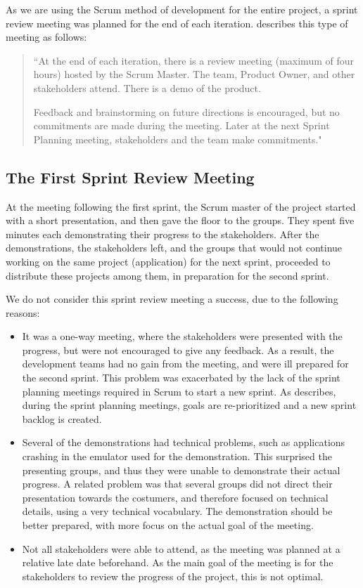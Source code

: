 As we are using the Scrum method of development for the entire \giraf project, a sprint review meeting was planned for the end of each iteration. 
\citet[p. 71]{larmanAgile} describes this type of meeting as follows:
\begin{quote}
``At the end of each iteration, there is a review meeting (maximum of four hours)
hosted by the Scrum Master.
The team, Product Owner, and other stakeholders attend.
There is a demo of the product.

Feedback and brainstorming on future directions is encouraged, but no commitments are made during the meeting.
Later at the next Sprint Planning meeting, stakeholders and the team make commitments."
\end{quote}

\subsection{The First Sprint Review Meeting}
At the meeting following the first sprint, the Scrum master of the \giraf project started with a short presentation, and then gave the floor to the groups.
They spent five minutes each demonstrating their progress to the stakeholders. 
After the demonstrations, the stakeholders left, and the groups that would not continue working on the same project (\giraf application) for the next sprint, proceeded to distribute these projects among them, in preparation for the second sprint.

We do not consider this sprint review meeting a success, due to the following reasons:
\begin{itemize}
	\item It was a one-way meeting, where the stakeholders were presented with the progress, but were not encouraged to give any feedback. 
	As a result, the development teams had no gain from the meeting, and were ill prepared for the second sprint. 
	This problem was exacerbated by the lack of the sprint planning meetings required in Scrum to start a new sprint.
	As \citet[p. 70]{larmanAgile} describes, during the sprint planning meetings, goals are re-prioritized and a new sprint backlog is created. 
	\item Several of the demonstrations had technical problems, such as applications crashing in the emulator used for the demonstration.
	This surprised the presenting groups, and thus they were unable to demonstrate their actual progress.
	A related problem was that several groups did not direct their presentation towards the costumers, and therefore focused on technical details, using a very technical vocabulary.
	The demonstration should be better prepared, with more focus on the actual goal of the meeting.
	\item Not all stakeholders were able to attend, as the meeting was planned at a relative late date beforehand.
	As the main goal of the meeting is for the stakeholders to review the progress of the project, this is not optimal.
\end{itemize}

